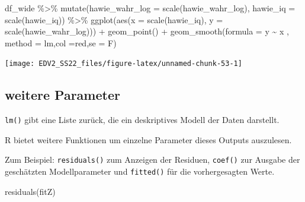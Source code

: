 \documentclass[
]{book}
\newenvironment{Shaded}{\begin{snugshade}}{\end{snugshade}}
\newcommand{\AttributeTok}[1]{\textcolor[rgb]{0.77,0.63,0.00}{#1}}
\newcommand{\FunctionTok}[1]{\textcolor[rgb]{0.00,0.00,0.00}{#1}}
\newcommand{\NormalTok}[1]{#1}
\newcommand{\SpecialCharTok}[1]{\textcolor[rgb]{0.00,0.00,0.00}{#1}}
\newcommand{\StringTok}[1]{\textcolor[rgb]{0.31,0.60,0.02}{#1}}
\begin{document}
\begin{Shaded}
\begin{Highlighting}[]
\NormalTok{df\_wide }\SpecialCharTok{\%\textgreater{}\%} 
  \FunctionTok{mutate}\NormalTok{(}\AttributeTok{hawie\_wahr\_log =} \FunctionTok{scale}\NormalTok{(hawie\_wahr\_log),}
         \AttributeTok{hawie\_iq =} \FunctionTok{scale}\NormalTok{(hawie\_iq)) }\SpecialCharTok{\%\textgreater{}\%} 
  \FunctionTok{ggplot}\NormalTok{(}\FunctionTok{aes}\NormalTok{(}\AttributeTok{x =} \FunctionTok{scale}\NormalTok{(hawie\_iq), }
                      \AttributeTok{y =} \FunctionTok{scale}\NormalTok{(hawie\_wahr\_log))) }\SpecialCharTok{+}
    \FunctionTok{geom\_point}\NormalTok{() }\SpecialCharTok{+}
    \FunctionTok{geom\_smooth}\NormalTok{(}\AttributeTok{formula =}\NormalTok{  y }\SpecialCharTok{\textasciitilde{}}\NormalTok{ x ,}
                \AttributeTok{method =} \StringTok{\textquotesingle{}lm\textquotesingle{}}\NormalTok{,}\AttributeTok{col =}\StringTok{\textquotesingle{}red\textquotesingle{}}\NormalTok{,}\AttributeTok{se =}\NormalTok{ F)}
\end{Highlighting}
\end{Shaded}

\begin{center}\texttt{[image: EDV2\_SS22\_files/figure-latex/unnamed-chunk-53-1]} \end{center}

\hypertarget{weitere-parameter}{%
\subsection{weitere Parameter}\label{weitere-parameter}}

\texttt{lm()} gibt eine Liste zurück, die ein deskriptives Modell der Daten darstellt.

R bietet weitere Funktionen um einzelne Parameter dieses Outputs auszulesen.

Zum Beispiel:
\texttt{residuals()} zum Anzeigen der Residuen, \texttt{coef()} zur Ausgabe der geschätzten Modellparameter und \texttt{fitted()} für die vorhergesagten Werte.

\begin{Shaded}
\begin{Highlighting}[]
\FunctionTok{residuals}\NormalTok{(fitZ)}
\end{Highlighting}
\end{Shaded}
\end{document}

